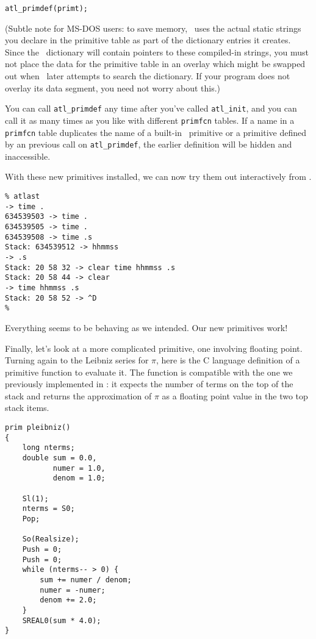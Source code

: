 \documentclass[twocolumn]{article}
\begin{document}
\verb+atl_primdef(primt);+

(Subtle note for MS-DOS users: to save memory, \atlast\ uses the
actual static strings you declare in the primitive table as part of
the dictionary entries it creates.
Since the
\atlast\ dictionary will contain pointers to these compiled-in strings,
you must not place the data for the primitive table in an overlay
which might be swapped out when \atlast\ later attempts to search the
dictionary.  If your program does not overlay its data segment, you
need not worry about this.)

You can call \verb+atl_primdef+ any time after you've called
\verb+atl_init+, and you can call it as many times as you like with
different {\tt primfcn} tables.  If a name in a {\tt primfcn} table
duplicates the name of a built-in \atlast\ primitive or a primitive
defined by an previous call on \verb+atl_primdef+, the earlier
definition will be hidden and inaccessible.

With these new primitives installed, we can now try them out interactively from
\atlast .

\begin{verbatim}
% atlast
-> time .
634539503 -> time .
634539505 -> time .
634539508 -> time .s
Stack: 634539512 -> hhmmss
-> .s
Stack: 20 58 32 -> clear time hhmmss .s
Stack: 20 58 44 -> clear
-> time hhmmss .s
Stack: 20 58 52 -> ^D
%
\end{verbatim}

Everything seems to be behaving as we intended.  Our new primitives
work!

Finally, let's look at a more complicated primitive, one involving
floating point.  Turning again to the Leibniz series for $\pi$, here
is the C language definition of a primitive function to evaluate
it.  The function is compatible with the one we previously implemented
in \atlast : it expects the number of terms on the top of the stack and
returns the approximation of $\pi$ as a floating point value in the two
top stack items.

\begin{verbatim}
prim pleibniz()
{
    long nterms;
    double sum = 0.0,
           numer = 1.0,
           denom = 1.0;

    Sl(1);
    nterms = S0;
    Pop;

    So(Realsize);
    Push = 0;
    Push = 0;
    while (nterms-- > 0) {
        sum += numer / denom;
        numer = -numer;
        denom += 2.0;
    }
    SREAL0(sum * 4.0);
}
\end{verbatim}
\end{document}
